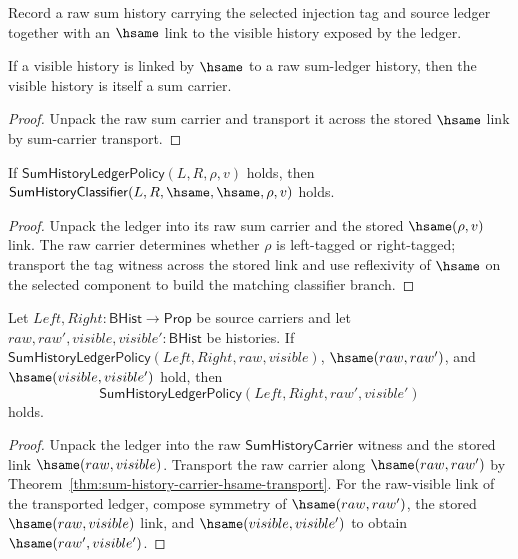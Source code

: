 \begin{definition}
\label{def:sum-ledger-policy}
Record a raw sum history carrying the selected injection tag and source ledger
together with an \(\hsame\) link to the visible history exposed by the ledger.
\end{definition}

\begin{theorem}
\label{thm:sum-ledger-visible-carrier}
If a visible history is linked by \(\hsame\) to a raw sum-ledger history, then
the visible history is itself a sum carrier.
\end{theorem}
\begin{proof}
Unpack the raw sum carrier and transport it across the stored \(\hsame\) link
by sum-carrier transport.
\end{proof}

\begin{theorem}
\label{thm:sum-ledger-raw-visible-classifier}
If $\mathsf{SumHistoryLedgerPolicy}(L,R,\rho,v)$ holds, then
$\mathsf{SumHistoryClassifier}(L,R,\hsame,\hsame,\rho,v)$ holds.
\end{theorem}
\begin{proof}
Unpack the ledger into its raw sum carrier and the stored $\hsame(\rho,v)$
link. The raw carrier determines whether $\rho$ is left-tagged or right-tagged;
transport the tag witness across the stored link and use reflexivity of
$\hsame$ on the selected component to build the matching classifier branch.
\end{proof}

\begin{theorem}
\label{thm:sum-ledger-history-same-transport}
Let $Left,Right:\mathsf{BHist}\to\mathsf{Prop}$ be source carriers and let
$raw,raw',visible,visible':\mathsf{BHist}$ be histories. If
$\mathsf{SumHistoryLedgerPolicy}(Left,Right,raw,visible)$,
$\hsame(raw,raw')$, and $\hsame(visible,visible')$ hold, then
$$
  \mathsf{SumHistoryLedgerPolicy}(Left,Right,raw',visible')
$$
holds.
\end{theorem}
\begin{proof}
Unpack the ledger into the raw $\mathsf{SumHistoryCarrier}$ witness and the
stored link $\hsame(raw,visible)$. Transport the raw carrier along
$\hsame(raw,raw')$ by
Theorem~\ref{thm:sum-history-carrier-hsame-transport}. For the raw-visible
link of the transported ledger, compose symmetry of $\hsame(raw,raw')$, the
stored $\hsame(raw,visible)$ link, and $\hsame(visible,visible')$ to obtain
$\hsame(raw',visible')$.
\end{proof}


